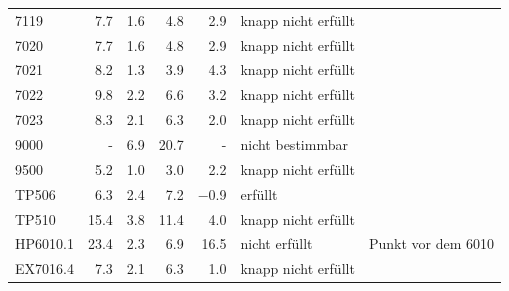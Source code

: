 {\begin{longtable}{p{1.6cm} r r r r l p{3.6cm}}
        7119 & 7.7 & 1.6 & 4.8 & 2.9 & knapp nicht erfüllt &  \\
        7020 & 7.7 & 1.6 & 4.8 & 2.9 & knapp nicht erfüllt &  \\
        7021 & 8.2 & 1.3 & 3.9 & 4.3 & knapp nicht erfüllt &  \\
        7022 & 9.8 & 2.2 & 6.6 & 3.2 & knapp nicht erfüllt &  \\
        7023 & 8.3 & 2.1 & 6.3 & 2.0 & knapp nicht erfüllt &  \\
        9000 & - & 6.9 & 20.7 & - & nicht bestimmbar &  \\
        9500 & 5.2 & 1.0 & 3.0 & 2.2 & knapp nicht erfüllt &  \\
        TP506 & 6.3 & 2.4 & 7.2 & $-$0.9 & erfüllt &  \\
        TP510 & 15.4 & 3.8 & 11.4 & 4.0 & knapp nicht erfüllt &  \\
        HP6010.1 & 23.4 & 2.3 & 6.9 & 16.5 & nicht erfüllt & Punkt vor dem 6010 \\
        EX7016.4 & 7.3 & 2.1 & 6.3 & 1.0 & knapp nicht erfüllt &  \\
\end{longtable}
}